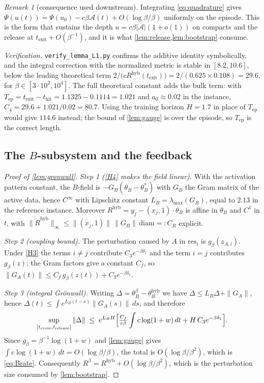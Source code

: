 \documentclass[11pt]{article}
\theoremstyle{definition}
\theoremstyle{remark}
\newtheorem{remark}[remark]{Remark}
\newcommand{\thit}{t_{\mathrm{hit}}}
\newcommand{\texit}{t_{\mathrm{exit}}}
\newcommand{\trel}{t_{\mathrm{release}}}
\newcommand{\Ar}{\mathcal{A}}                      %
\newcommand{\Tep}{T_{\mathrm{ep}}}                 %
\newcommand{\hyb}{\mathrm{hyb}}
\begin{document}
\begin{remark}[consequence used downstream]\label{rem:L1cons}
Integrating \eqref{eq:quadrature} gives
$\Psi(u(t))=\Psi(u_0)-c\beta\Ar(t)+O(\log\beta/\beta)$ uniformly on the episode.
This is the form that sustains the depth $u=c\beta|\Ar|(1+o(1))$ on compacts and
the release at $\texit+O(\beta^{-1})$, and it is what
\cref{lem:release,lem:bootstrap} consume.
\end{remark}

\noindent\emph{Verification.} \texttt{verify\_lemma\_L1.py} confirms the
additive identity symbolically, and the integral correction with the normalized
metric is stable in $[8.2,10.6]$, below the leading theoretical term
$2/\bigl(cR^{\hyb}(\texit)\bigr)=2/(0.625\times0.108)=29.6$, for
$\beta\in[3\cdot10^2,10^4]$. The full theoretical constant adds the bulk term:
with $\Tep=\texit-\thit=1.1325-0.1114=1.021$ and $a_0\approx0.02$ in the instance,
$C_4=29.6+1.021/0.02=80.7$. Using the training horizon $H=1.7$ in place of $\Tep$
would give $114.6$ instead; the bound of \cref{lem:gauge} is over the episode,
so $\Tep$ is the correct length.

\subsection{The \texorpdfstring{$B$}{B}-subsystem and the feedback}\label{app:L2}

\begin{proof}[Proof of \cref{lem:gronwall}]
\emph{Step 1 (\eqref{H4} makes the field linear).} With the activation pattern
constant, the $B$-field is $-G_B(\theta_B-\theta_B^\ast)$ with $G_B$ the Gram
matrix of the active data, hence $C^\infty$ with Lipschitz constant
$L_B=\lambda_{\max}(G_B)$, equal to $2.13$ in the reference instance. Moreover
$R^{\hyb}=y_j-(x_j,1)\cdot\theta_B$ is affine in $\theta_B$ and $C^1$ in $t$,
with $\|\dot R^{\hyb}\|_\infty\le\|(x_j,1)\|\,\|G_B\|\,\mathrm{diam}=:C_R$
explicit.

\emph{Step 2 (coupling bound).} The perturbation caused by $A$ in
$\mathrm{res}_i$ is $g_\beta(z_{A,i})$. Under \eqref{H3} the terms $i\ne j$
contribute $C_3e^{-\beta\delta_1}$ and the term $i=j$ contributes $g_\beta(z)$;
the Gram factors give a constant $C_f$, so
$\|G_A(t)\|\le C_f\,g_\beta(z(t))+C_3e^{-\beta\delta_1}$.

\emph{Step 3 (integral Gr\"onwall).} Writing $\Delta=\theta_B^\beta-\theta_B^{\hyb}$
we have $\dot\Delta\le L_B\Delta+\|G_A\|$, hence
$\Delta(t)\le\int e^{L_B(t-s)}\|G_A(s)\|\,ds$, and therefore
\[
\sup_{[t_{\mathrm{cross}},\trel]}\|\Delta\|
\;\le\;e^{L_BH}\Bigl[\tfrac{C_f}{c\beta}\int c\log(1+w)\,dt
+H\,C_3e^{-\beta\delta_1}\Bigr].
\]
Since $g_\beta=\beta^{-1}\log(1+w)$ and \cref{lem:gauge} gives
$\int c\log(1+w)\,dt=O(\log\beta/\beta)$, the total is $O(\log\beta/\beta^{2})$,
which is \eqref{eq:Brate}. Consequently $R^\beta=R^{\hyb}+O(\log\beta/\beta^{2})$,
which is the perturbation size consumed by \cref{lem:bootstrap}.
\end{proof}
\end{document}
